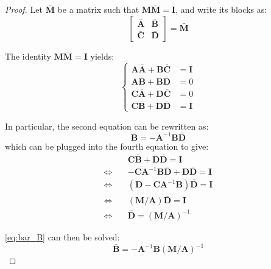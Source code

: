 \begin{proof}
	Let $\bar{\mathbf{M}}$ be a matrix such that $\mathbf{M}\bar{\mathbf{M}}=\mathbf{I}$, and write its blocks as:
	\begin{equation}
		\begin{bmatrix}\bar{\mathbf{A}}&\bar{\mathbf{B}}\\\bar{\mathbf{C}}&\bar{\mathbf{D}}\end{bmatrix}=\bar{\mathbf{M}}
	\end{equation}

	The identity $\mathbf{M}\bar{\mathbf{M}}=\mathbf{I}$ yields:
	\begin{equation}
		\left\{\begin{aligned}
		\mathbf{A}\bar{\mathbf{A}}+\mathbf{B}\bar{\mathbf{C}}&=\mathbf{I}\\
		\mathbf{A}\bar{\mathbf{B}}+\mathbf{B}\bar{\mathbf{D}}&=0\\
		\mathbf{C}\bar{\mathbf{A}}+\mathbf{D}\bar{\mathbf{C}}&=0\\
		\mathbf{C}\bar{\mathbf{B}}+\mathbf{D}\bar{\mathbf{D}}&=\mathbf{I}
		\end{aligned}\right.
	\end{equation}

	In particular, the second equation can be rewritten as:
	\begin{equation}
		\bar{\mathbf{B}}=-\mathbf{A}^{-1}\mathbf{B}\bar{\mathbf{D}}\label{eq:bar_B}
	\end{equation}
	which can be plugged into the fourth equation to give:
	\begin{equation}
		\begin{aligned}
		&\mathbf{C}\bar{\mathbf{B}}+\mathbf{D}\bar{\mathbf{D}}=\mathbf{I}\\
		\iff\quad&-\mathbf{C}\mathbf{A}^{-1}\mathbf{B}\bar{\mathbf{D}}+\mathbf{D}\bar{\mathbf{D}}=\mathbf{I}\\
		\iff\quad&(\mathbf{D}-\mathbf{C}\mathbf{A}^{-1}\mathbf{B})\bar{\mathbf{D}}=\mathbf{I}\\
		\iff\quad&(\mathbf{M}/\mathbf{A})\bar{\mathbf{D}}=\mathbf{I}\\
		\iff\quad&\bar{\mathbf{D}}=(\mathbf{M}/\mathbf{A})^{-1}
		\end{aligned}
	\end{equation}

	\eqref{eq:bar_B} can then be solved:
	\begin{equation}
		\bar{\mathbf{B}}=-\mathbf{A}^{-1}\mathbf{B}(\mathbf{M}/\mathbf{A})^{-1}
	\end{equation}


\end{proof}
